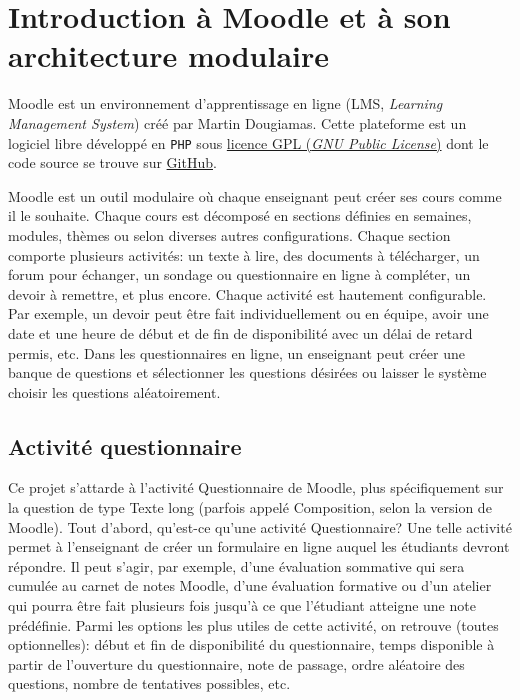\chapter{Introduction \`a Moodle et \`a son architecture modulaire}
Moodle est un environnement d'apprentissage en ligne (LMS, \textit{Learning Management System}) cr\'e\'e par Martin Dougiamas.
%
%
%
%
Cette plateforme est un logiciel libre d\'evelopp\'e en \texttt{PHP} sous \href{http://docs.moodle.org/dev/License}{licence GPL (\textit{GNU Public License})} dont le code source se trouve sur \href{https://github.com/moodle/moodle}{GitHub}.

Moodle est un outil modulaire o\`u chaque enseignant peut cr\'eer ses cours comme il le souhaite.
Chaque cours est d\'ecompos\'e en sections d\'efinies en semaines, modules, th\`emes ou selon diverses autres configurations.
Chaque section comporte plusieurs activit\'es: un texte \`a lire, des documents \`a t\'el\'echarger, un forum pour \'echanger, un sondage ou questionnaire en ligne \`a compl\'eter, un devoir \`a remettre, et plus encore.
Chaque activit\'e est hautement configurable.
Par exemple, un devoir peut \^etre fait individuellement ou en \'equipe, avoir une date et une heure de d\'ebut et de fin de disponibilit\'e avec un d\'elai de retard permis, etc.
Dans les questionnaires en ligne, un enseignant peut cr\'eer une banque de questions et s\'electionner les questions d\'esir\'ees ou laisser le syst\`eme choisir les questions al\'eatoirement.

\section{Activit\'e questionnaire}
Ce projet s'attarde \`a l'activit\'e Questionnaire de Moodle, plus sp\'ecifiquement sur la question de type Texte long (parfois appel\'e Composition, selon la version de Moodle).
Tout d'abord, qu'est-ce qu'une activit\'e Questionnaire?
Une telle activit\'e permet \`a l'enseignant de cr\'eer un formulaire en ligne auquel les \'etudiants devront r\'epondre.
Il peut s'agir, par exemple, d'une \'evaluation sommative qui sera cumul\'ee au carnet de notes Moodle, d'une \'evaluation formative ou d'un atelier qui pourra \^etre fait plusieurs fois jusqu'\`a ce que l'\'etudiant atteigne une note pr\'ed\'efinie.
Parmi les options les plus utiles de cette activit\'e, on retrouve (toutes optionnelles): d\'ebut et fin de disponibilit\'e du questionnaire, temps disponible \`a partir de l'ouverture du questionnaire, note de passage, ordre al\'eatoire des questions, nombre de tentatives possibles, etc.

